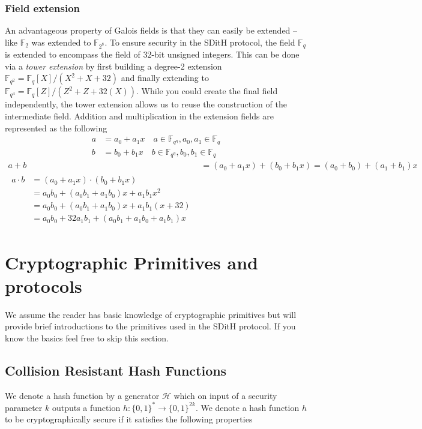 \documentclass[11pt]{report}
\theoremstyle{definition}
\theoremstyle{plain}
\begin{document}
\subsubsection{Field extension}\label{sub:field_extension}

An advantageous property of Galois fields is that they can easily be extended -- like $\mathbb{F}_{2}$ was extended to $\mathbb{F}_{2^8}$. To ensure security in the SDitH protocol, the field $\mathbb{F}_q$ is extended to encompass the field of 32-bit unsigned integers. This can be done via a \textit{tower extension} by first building a degree-2 extension $\mathbb{F}_{q^2} = \mathbb{F}_q[X] / (X^2 + X + 32)$ and finally extending to $\mathbb{F}_{q^4} = \mathbb{F}_q[Z] / (Z^2 + Z + 32(X))$. While you could create the final field independently, the tower extension allows us to reuse the construction of the intermediate field. Addition and multiplication in the extension fields are represented as the following
\begin{align*}
  a & = a_0 + a_1x  \quad a \in \mathbb{F}_{q^\eta}, a_0, a_1 \in \mathbb{F}_q \\
  b & = b_0 + b_1x  \quad b \in \mathbb{F}_{q^\eta}, b_0, b_1 \in \mathbb{F}_q
\end{align*}
\begin{align}
  a + b & = (a_0 + a_1x) + (b_0 + b_1x) = (a_0 + b_0) + (a_1 + b_1)x \\
  \begin{split}
    a \cdot b & = (a_0 + a_1x) \cdot (b_0 + b_1x)                                         \\
    & = a_0b_0 + (a_0b_1 + a_1b_0)x + a_1b_1x^2                                 \\
    & = a_0b_0 + (a_0b_1 + a_1b_0)x + a_1b_1(x + 32)                            \\
    & = a_0b_0 + 32a_1b_1 + (a_0b_1 + a_1b_0 + a_1b_1)x
  \end{split}\label{eq:gf256_ext_mul}
\end{align}

\section{Cryptographic Primitives and protocols}
We assume the reader has basic knowledge of cryptographic primitives but will provide brief introductions to the primitives used in the SDitH protocol. If you know the basics feel free to skip this section.

\subsection{Collision Resistant Hash Functions}\label{sec:prelim_hash}
We denote a hash function by a generator $\mathcal{H}$ which on input of a security parameter $k$ outputs a function $h : \{0,1{\}}^* \rightarrow \{0,1{\}}^{2k}$. We denote a hash function $h$ to be cryptographically secure if it satisfies the following properties
\end{document}
